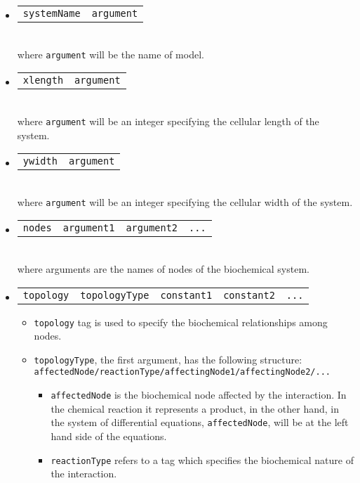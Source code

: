 \documentclass[a4paper, 11pt]{article}
\begin{document}
\begin{itemize}
\item
  \begin{tabular}{cc}
    \texttt{systemName}&\texttt{argument}
  \end{tabular}\\[1.5ex]
  where \texttt{argument} will be the name of model.
\item
  \begin{tabular}{cc}
    \texttt{xlength}&\texttt{argument}
  \end{tabular}\\[1.5ex]
  where \texttt{argument} will be an integer specifying the cellular length of the system. 
\item
  \begin{tabular}{cc}
    \texttt{ywidth}&\texttt{argument}
  \end{tabular}\\[1.5ex]
  where \texttt{argument} will be an integer specifying the cellular width of the system. 
\item
  \begin{tabular}{cccc}
    \texttt{nodes}&\texttt{argument1}&\texttt{argument2}&\texttt{...}
  \end{tabular}\\[1.5ex]
  where arguments are the names of nodes of the biochemical system.
\item
  \begin{tabular}{ccccc}
    \texttt{topology}&\texttt{topologyType}&\texttt{constant1}&\texttt{constant2}&\texttt{...}
  \end{tabular}
  \begin{itemize}
  \item
    \texttt{topology} tag is used to specify the biochemical relationships among nodes.
  \item
    \texttt{topologyType}, the first argument, has the following structure:\\[1.5ex]
    \texttt{affectedNode/reactionType/affectingNode1/affectingNode2/...}\\[1.5ex]
    \begin{itemize}
    \item
      \texttt{affectedNode} is the biochemical node affected by the interaction.
      In the chemical reaction it represents a product, in the other hand, in the system of differential equations, \texttt{affectedNode}, will be at the left hand side of the equations.
    \item
      \texttt{reactionType} refers to a tag which specifies the biochemical nature of the interaction.

\end{itemize}
\end{itemize}
\end{itemize}
\end{document}
